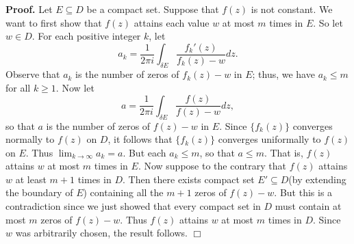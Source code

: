 \documentclass[9pt]{article}
\newcommand{\qed}{\hfill \ensuremath{\Box}}
\begin{document}
\begin{enumerate}
      \textbf{Proof.} Let $E \subseteq D$ be a compact set. Suppose that $f(z)$
      is not constant. We want to first show that $f(z)$ attains each value $w$
      at most $m$ times in $E$. So let $w \in D$. For each positive integer $k$,
      let
      $$a_k = \frac{1}{2\pi i}\int_{\delta E}\frac{f_k'(z)}{f_k(z) - w} dz.$$
      Observe that $a_k$ is the number of zeros of $f_k(z) - w$ in $E$; thus, we
      have $a_k \le m$ for all $k \ge 1$. Now let
      $$a = \frac{1}{2\pi i}\int_{\delta E}\frac{f(z)}{f(z) - w} dz,$$
      so that $a$ is the number of zeros of $f(z) - w$ in $E$. Since
      $\{f_k(z)\}$ converges normally to $f(z)$ on $D$, it follows that
      $\{f_k(z)\}$ converges uniformally to $f(z)$ on $E$. Thus
      $\lim_{k\rightarrow\infty}a_k = a$. But each $a_k \le m$, so that
      $a \le m$. That is, $f(z)$ attains $w$ at most $m$ times in $E$. Now
      suppose to the contrary that $f(z)$ attains $w$ at least $m + 1$ times in
      $D$. Then there exists compact set $E' \subseteq D$(by extending the
      boundary of $E$) containing all the $m+1$ zeros of $f(z) - w$. But this is
      a contradiction since we just showed that every compact set in $D$ must
      contain at most $m$ zeros of $f(z) - w$. Thus $f(z)$ attains $w$ at most
      $m$ times in $D$. Since $w$ was arbitrarily chosen, the result follows.
      \qed
\end{enumerate}
\end{document}
